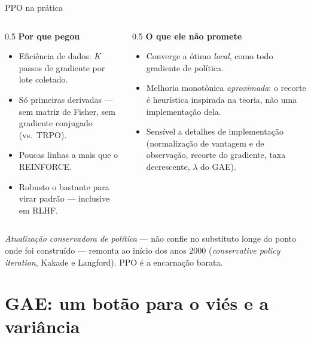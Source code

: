 \documentclass[aspectratio=169, 10pt]{beamer}
\begin{document}
\begin{frame}{PPO na prática}

  \begin{columns}[T]
  \begin{column}{0.5\textwidth}
    \textbf{Por que pegou}
    \begin{itemize}\setlength{\itemsep}{0.2ex}
      \item Eficiência de dados: $K$ passos de gradiente por lote coletado.
      \item Só primeiras derivadas --- sem matriz de Fisher, sem gradiente conjugado
        (vs.\ TRPO).
      \item Poucas linhas a mais que o REINFORCE.
      \item Robusto o bastante para virar padrão --- inclusive em RLHF.
    \end{itemize}
  \end{column}
  \begin{column}{0.5\textwidth}
    \textbf{O que ele não promete}
    \begin{itemize}\setlength{\itemsep}{0.2ex}
      \item Converge a ótimo \emph{local}, como todo gradiente de política.
      \item Melhoria monotônica \emph{aproximada}: o recorte é heurística inspirada
        na teoria, não uma implementação dela.
      \item Sensível a detalhes de implementação (normalização de vantagem e de
        observação, recorte do gradiente, taxa decrescente, $\lambda$ do GAE).
    \end{itemize}
  \end{column}
  \end{columns}

  \begin{alertabox}
    \emph{Atualização conservadora de política} --- não confie no substituto longe
    do ponto onde foi construído --- remonta ao início dos anos 2000
    (\emph{conservative policy iteration}, Kakade e Langford). PPO é a encarnação
    barata.
  \end{alertabox}
\end{frame}

\section{GAE: um botão para o viés e a variância}
\end{document}
